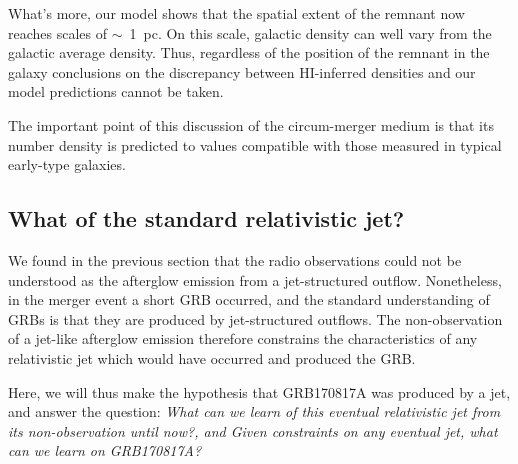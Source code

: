 What's more, our model shows that the spatial extent of the remnant now reaches scales of $\sim$~1~pc. On this scale, galactic density can well vary from the galactic average density. Thus, regardless of the position of the remnant in the galaxy conclusions on the discrepancy between HI-inferred densities and our model predictions cannot be taken.

The important point of this discussion of the circum-merger medium is that its number density is predicted to values compatible with those measured in typical early-type galaxies.






\subsection{What of the standard relativistic jet?}

We found in the previous section that the radio observations could not be understood as the afterglow emission from a jet-structured outflow. Nonetheless, in the merger event a short GRB occurred, and the standard understanding of GRBs is that they are produced by jet-structured outflows. The non-observation of a jet-like afterglow emission therefore constrains the characteristics of any relativistic jet which would have occurred and produced the GRB.


Here, we will thus make the hypothesis that GRB170817A was produced by a jet, and answer the question: \it{What can we learn of this eventual relativistic jet from its non-observation until now?}, and \it{Given constraints on any eventual jet, what can we learn on GRB170817A?}

